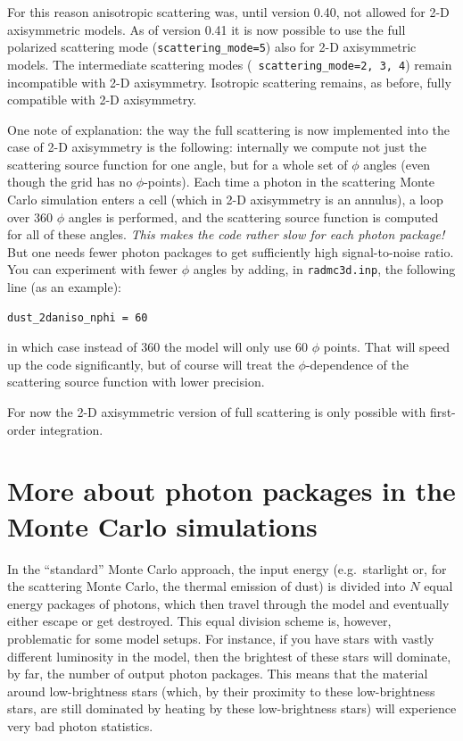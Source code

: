 \documentclass{report}
\begin{document}
For this reason anisotropic scattering was, until version 0.40, not allowed
for 2-D axisymmetric models. As of version 0.41 it is now possible to use
the full polarized scattering mode ({\small\tt scattering\_mode=5}) also for
2-D axisymmetric models. The intermediate scattering modes ({\small\tt
  scattering\_mode=2, 3, 4}) remain incompatible with 2-D axisymmetry.
Isotropic scattering remains, as before, fully compatible with 2-D
axisymmetry.

One note of explanation: the way the full scattering is now implemented into
the case of 2-D axisymmetry is the following: internally we compute not just
the scattering source function for one angle, but for a whole set of $\phi$
angles (even though the grid has no $\phi$-points). Each time a photon in
the scattering Monte Carlo simulation enters a cell (which in 2-D
axisymmetry is an annulus), a loop over 360 $\phi$ angles is performed, and
the scattering source function is computed for all of these angles.  {\em
  This makes the code rather slow for each photon package!} But one needs
fewer photon packages to get sufficiently high signal-to-noise ratio. You
can experiment with fewer $\phi$ angles by adding, in {\small\tt radmc3d.inp},
the following line (as an example):
{\small\begin{verbatim}
dust_2daniso_nphi = 60
\end{verbatim}}
in which case instead of 360 the model will only use 60 $\phi$ points. That
will speed up the code significantly, but of course will treat the
$\phi$-dependence of the scattering source function with lower precision.

For now the 2-D axisymmetric version of full scattering is only possible 
with first-order integration. 



\section{More about photon packages in the Monte Carlo simulations}
\label{sec-photon-packages-mc}
%
In the ``standard'' Monte Carlo approach, the input energy (e.g.\ starlight
or, for the scattering Monte Carlo, the thermal emission of dust) is divided
into $N$ equal energy packages of photons, which then travel through the
model and eventually either escape or get destroyed. This equal division
scheme is, however, problematic for some model setups. For instance, if you
have stars with vastly different luminosity in the model, then the brightest
of these stars will dominate, by far, the number of output photon packages.
This means that the material around low-brightness stars (which, by their
proximity to these low-brightness stars, are still dominated by heating by
these low-brightness stars) will experience very bad photon statistics.
\end{document}
